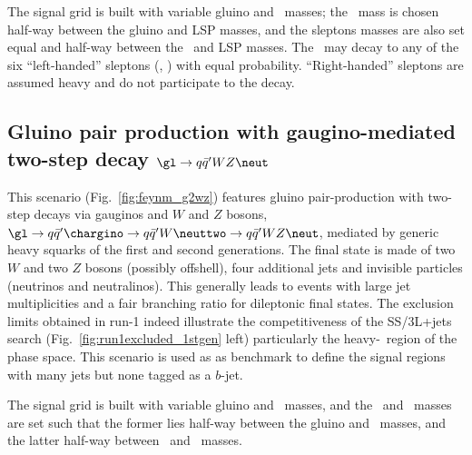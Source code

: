 The signal grid is built with variable gluino and \neut\ masses; the \neuttwo\ mass is chosen half-way between the gluino and LSP masses, 
and the sleptons masses are also set equal and half-way between the \neuttwo\ and LSP masses. 
The \neuttwo\ may decay to any of the six ``left-handed'' sleptons (\slep, \snu) with equal probability. 
``Right-handed'' sleptons are assumed heavy and do not participate to the decay. 


\subsection{Gluino pair production with gaugino-mediated two-step decay $\gl\to q\bar q'WZ\neut$}
\label{subsec:signals_g2wz}

This scenario (Fig.~\ref{fig:feynm_g2wz}) features gluino pair-production with two-step decays via gauginos and $W$ and $Z$ bosons, 
$\gl\to q\bar{q}'\chargino\to q\bar{q}'W\neuttwo\to q\bar{q}'WZ\neut$, 
mediated by generic heavy squarks of the first and second generations. 
The final state is made of two $W$ and two $Z$ bosons (possibly offshell), 
four additional jets and invisible particles (neutrinos and neutralinos). 
This generally leads to events with large jet multiplicities and a fair branching ratio for dileptonic final states. 
The exclusion limits obtained in run-1 indeed illustrate the competitiveness of the SS/3L+jets search (Fig.~\ref{fig:run1excluded_1stgen} left)
particularly the heavy-\neut\ region of the phase space. 
This scenario is used as as benchmark to define the signal regions with many jets but none tagged as a $b$-jet. 

The signal grid is built with variable gluino and \neut\ masses, 
and the \chargino\ and \neuttwo\ masses are set such that the former lies half-way between the gluino and \neut\ masses, 
and the latter half-way between \chargino\ and \neut\ masses. 

